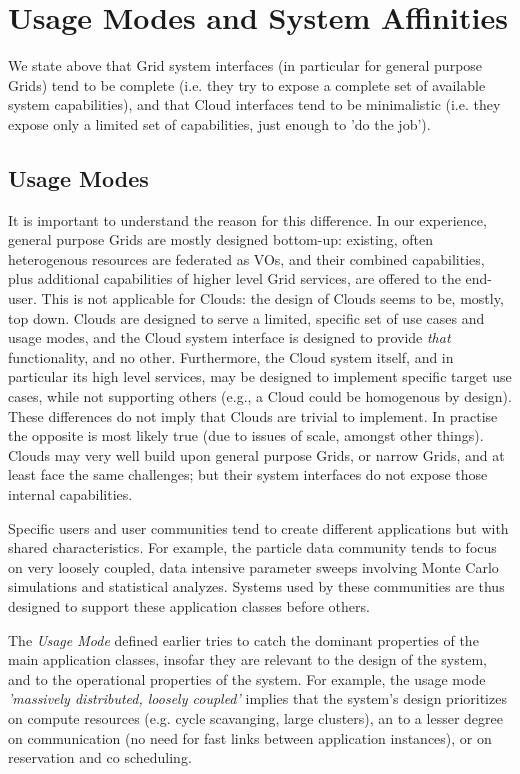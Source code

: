 \documentclass[conference,final]{IEEEtran}
\newcommand{\I}[1]{\textit{#1}}
\begin{document}
\section{Usage Modes and System Affinities}

 We state above that Grid system interfaces (in particular for general
 purpose Grids) tend to be complete (i.e. they try to expose a
 complete set of available system capabilities), and that Cloud
 interfaces tend to be minimalistic (i.e. they expose only a limited
 set of capabilities, just enough to 'do the job').  
 
 \subsection{Usage Modes}

  It is important to understand the reason for this difference.  In
  our experience, general purpose Grids are mostly designed bottom-up:
  existing, often heterogenous resources are federated as VOs, and
  their combined capabilities, plus additional capabilities of higher
  level Grid services, are offered to the end-user.  This is not
  applicable for Clouds: the design of Clouds seems to be, mostly, top
  down. Clouds are designed to serve a limited, specific set of use
  cases and usage modes, and the Cloud system interface is designed to
  provide \I{that} functionality, and no other.  Furthermore, the
  Cloud system itself, and in particular its high level services, may
  be designed to implement specific target use cases, while not
  supporting others (e.g., a Cloud could be homogenous by design).
  These differences do not imply that Clouds are trivial to implement.
  In practise the opposite is most likely true (due to issues of
  scale, amongst other things). Clouds may very well build upon
  general purpose Grids, or narrow Grids, and at least face the same
  challenges; but their system interfaces do not expose those internal
  capabilities.

  Specific users and user communities tend to create different
  applications but with shared characteristics.  For example, the
  particle data community tends to focus on very loosely coupled, data
  intensive parameter sweeps involving Monte Carlo simulations and
  statistical analyzes.  Systems used by these communities are thus
  designed to support these application classes before others.
  
  The \I{Usage Mode} defined earlier tries to catch the dominant
  properties of the main application classes, insofar they are
  relevant to the design of the system, and to the operational
  properties of the system.  For example, the usage mode \I{'massively
  distributed, loosely coupled'} implies that the system's design
  prioritizes on compute resources (e.g. cycle scavanging, large
  clusters), an to a lesser degree on communication (no need for fast
  links between application instances), or on reservation and co
  scheduling.
\end{document}
